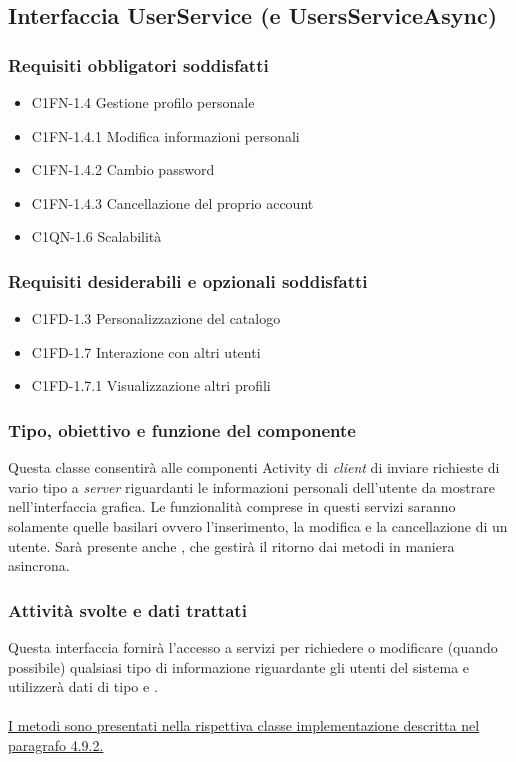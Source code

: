 \subsection{Interfaccia UserService (e UsersServiceAsync)}
\subsubsection*{Requisiti obbligatori soddisfatti}
\begin{itemize}
	\item C1FN-1.4 Gestione profilo personale
	\item C1FN-1.4.1 Modifica informazioni personali
	\item C1FN-1.4.2 Cambio password
	\item C1FN-1.4.3 Cancellazione del proprio account
    \item C1QN-1.6 Scalabilit\`a
\end{itemize}
\subsubsection*{Requisiti desiderabili e opzionali soddisfatti}
\begin{itemize}
    \item C1FD-1.3 Personalizzazione del catalogo
    \item C1FD-1.7 Interazione con altri utenti
    \item C1FD-1.7.1 Visualizzazione altri profili
\end{itemize}
\subsubsection*{Tipo, obiettivo e funzione del componente}
Questa classe consentir\`a alle componenti Activity di \emph{client} di inviare
richieste di vario tipo a \emph{server} riguardanti le informazioni personali
dell'utente da mostrare nell'interfaccia grafica. Le funzionalit\`a comprese in
questi servizi saranno solamente quelle basilari ovvero l'inserimento, la
modifica e la cancellazione di un utente. Sar\`a presente
anche , che gestir\`a il ritorno dai metodi in maniera
asincrona. 
\subsubsection*{Attivit\`a svolte e dati trattati}
Questa interfaccia fornir\`a l'accesso a servizi per richiedere o
modificare (quando possibile) qualsiasi tipo di informazione riguardante gli
utenti del sistema e utilizzer\`a dati di tipo 
e .\\\\
\underline{I metodi sono presentati nella rispettiva classe implementazione
descritta nel paragrafo 4.9.2.}

